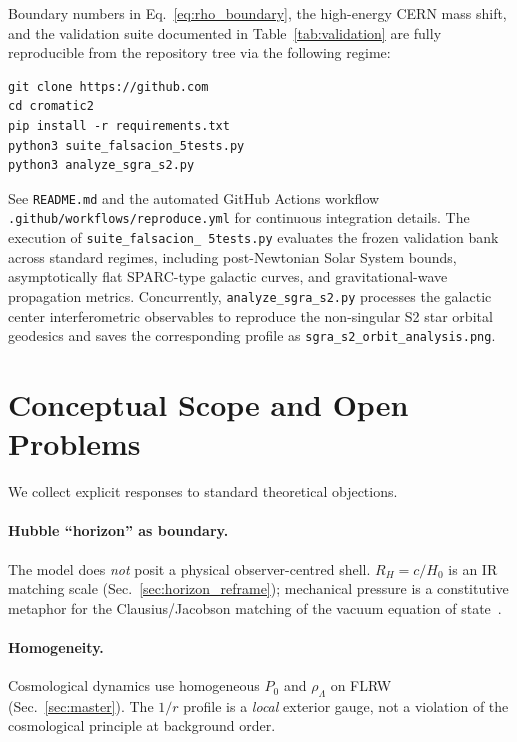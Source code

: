 \documentclass[prd,
               reprint,
               aps,
               preprintnumbers,
               nofootinbib,
               longbibliography,
               floatfix]{revtex4-2}
\begin{document}
Boundary numbers in Eq.~\eqref{eq:rho_boundary}, the high-energy 
CERN mass shift, and the validation suite documented in 
Table~\ref{tab:validation} are fully reproducible from the 
repository tree via the following regime:
\begin{verbatim}
git clone https://github.com
cd cromatic2
pip install -r requirements.txt
python3 suite_falsacion_5tests.py
python3 analyze_sgra_s2.py
\end{verbatim}
See \texttt{README.md} and the automated GitHub Actions workflow 
\texttt{.github/workflows/reproduce.yml} for continuous 
integration details. The execution of \texttt{suite\_falsacion\_%
5tests.py} evaluates the frozen validation bank across standard 
regimes, including post-Newtonian Solar System bounds, 
asymptotically flat SPARC-type galactic curves, and 
gravitational-wave propagation metrics. Concurrently, 
\texttt{analyze\_sgra\_s2.py} processes the galactic center 
interferometric observables to reproduce the non-singular 
S2 star orbital geodesics and saves the corresponding profile 
as \texttt{sgra\_s2\_orbit\_analysis.png}.


\section{Conceptual Scope and Open Problems}
\label{sec:limitations}

We collect explicit responses to standard theoretical objections.

\paragraph{Hubble ``horizon'' as boundary.}
The model does \emph{not} posit a physical observer-centred shell.
$R_H=c/H_0$ is an IR matching scale (Sec.~\ref{sec:horizon_reframe});
mechanical pressure is a constitutive metaphor for the
Clausius/Jacobson matching of the vacuum equation of
state~\cite{Jacobson1995,Padmanabhan2003}.

\paragraph{Homogeneity.}
Cosmological dynamics use homogeneous $P_0$ and $\rho_\Lambda$ on FLRW
(Sec.~\ref{sec:master}).
The $1/r$ profile is a \emph{local} exterior gauge, not a violation of
the cosmological principle at background order.
\end{document}
